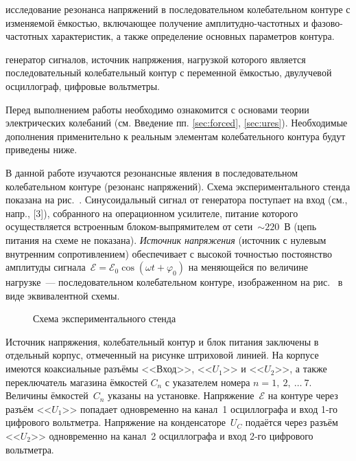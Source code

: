 \label{lab:322}

\begin{lab:aim}
     исследование резонанса напряжений в последовательном колебательном контуре
с изменяемой ёмкостью, включающее получение амплитудно-частотных и
фазово-частотных характеристик, а также определение основных параметров контура.
\end{lab:aim}

\begin{lab:equipment}
	генератор сигналов, источник напряжения, нагрузкой которого является
последовательный колебательный контур с переменной ёмкостью, двулучевой
осциллограф, цифровые вольтметры.
\end{lab:equipment}

Перед выполнением работы необходимо ознакомится с основами теории электрических  
колебаний (см. Введение пп. \ref{sec:forced}, \ref{sec:ures}).
Необходимые дополнения применительно к реальным элементам колебательного
контура будут приведены ниже.

\experiment

В данной работе изучаются резонансные явления в последовательном колебательном
контуре (резонанс напряжений). 
Схема экспериментального стенда показана на рис.~.
Синусоидальный сигнал от генератора поступает на вход  (см., напр., [3]), собранного на
операционном усилителе, питание которого осуществляется встроенным
блоком-выпрямителем от сети~$\sim220$~В (цепь питания на схеме не показана).
\emph{Источник напряжения} (источник с нулевым внутренним
сопротивлением) обеспечивает с высокой точностью постоянство
амплитуды сигнала~$\mathcal{E}=\mathcal{E}_0\cos(\omega t+\varphi_0)$ на
меняющейся по величине нагрузке~--- последовательном колебательном контуре,
изображенном на рис.~ в виде эквивалентной схемы. 

\begin{figure}[h!]
	\caption{Схема экспериментального стенда}
\end{figure}

Источник
напряжения, колебательный контур и блок питания заключены в отдельный корпус,
отмеченный на рисунке штриховой линией.
На корпусе имеются коаксиальные разъёмы <<Вход>>, <<$U_1$>> и <<$U_2$>>, а также
переключатель магазина ёмкостей $C_n$ с указателем номера $n=1,~2,~\ldots~7.$
Величины ёмкостей~$C_n$ указаны на установке. 
Напряжение~$\mathcal{E}$ на контуре через разъём <<$U_1$>> попадает одновременно 
на канал~1 осциллографа и вход 1-го цифрового вольтметра. Напряжение на конденсаторе~$U_C$ 
подаётся через разъём <<$U_2$>> одновременно на канал~2 осциллографа и
вход 2-го цифрового вольтметра.

